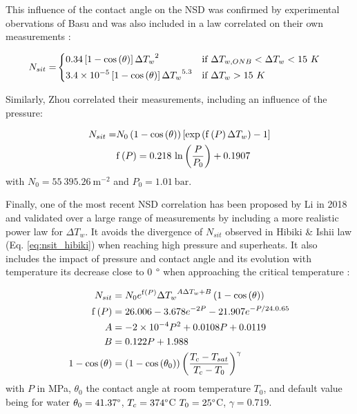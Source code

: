 This influence of the contact angle on the NSD was confirmed by experimental obervations of Basu \etal \cite{basu_nsit} and was also included in a law correlated on their own measurements :

\begin{align}
N_{sit}=&
\begin{dcases}
0.34\left[ 1-\mathrm{cos}\left( \theta \right) \right] {\Delta T_{w}}^{2} & \text{if } \Delta T_{w,ONB}<\Delta T_{w} < 15\ K\\
3.4\times 10^{-5}\left[ 1-\mathrm{cos}\left( \theta \right) \right] {\Delta T_{w}}^{5.3} & \text{if } \Delta T_{w} > 15\ K
\end{dcases}
\label{eq:nsit_basu}
\end{align}

\npar

Similarly, Zhou \etal \cite{zhou_nsd} correlated their measurements, including an influence of the pressure:

\begin{align}
N_{sit} =& N_{0}\left( 1-\mathrm{cos}\left( \theta \right) \right)\left[ \mathrm{exp}\left( \mathrm{f}\left( P \right) \Delta T_{w}  \right) -1  \right]
\label{eq:nsit_zhou}\\
&\mathrm{f}\left( P \right) = 0.218~\mathrm{ln}\left( \dfrac{P}{P_{0}} \right)+0.1907
\end{align}
with $N_{0}=55~395.26\ \mathrm{m}^{-2}$ and $P_{0}=1.01\ \mathrm{bar}$.

\npar

Finally, one of the most recent NSD correlation has been proposed by Li \etal in 2018 \cite{li_new_2018} and validated over a large range of measurements by including a more realistic power law for $\Delta T_{w}$. It avoids the divergence of $N_{sit}$ observed in Hibiki \& Ishii law (Eq. \ref{eq:nsit_hibiki}) when reaching high pressure and superheats. It also includes the impact of pressure and contact angle and its evolution with temperature \eg its decrease close to 0 $\degree$ when approaching the critical temperature \cite{song_fan_contact_angle}:


\begin{align}
N_{sit} &= N_{0}e^{\mathrm{f}\parth{P}} {\Delta T_{w}}^{A\Delta T_{w} + B} \parth{1- \cos{\theta}}
\label{eq:nsit_li}\\
%
\mathrm{f}\parth{P} &= 26.006 - 3.678 e^{-2P} - 21.907e^{-P / 24.0.65}\\
%
A &= -2\times 10^{-4} P^{2} + 0.0108P + 0.0119\\
%
B &= 0.122P +1.988\\
%
1-\cos{\theta} &= \parth{1-\cos{\theta_{0}}}\parth{\frac{T_{c}-T_{sat}}{T_{c}-T_{0}}}^{\gamma}
\end{align}
with $P$ in MPa, $\theta_{0}$ the contact angle at room temperature $T_{0}$, and default value being for water $\theta_{0}=41.37 \degree$, $T_{c}=374 \degree$C $T_{0}=25\degree$C, $\gamma = 0.719$.

